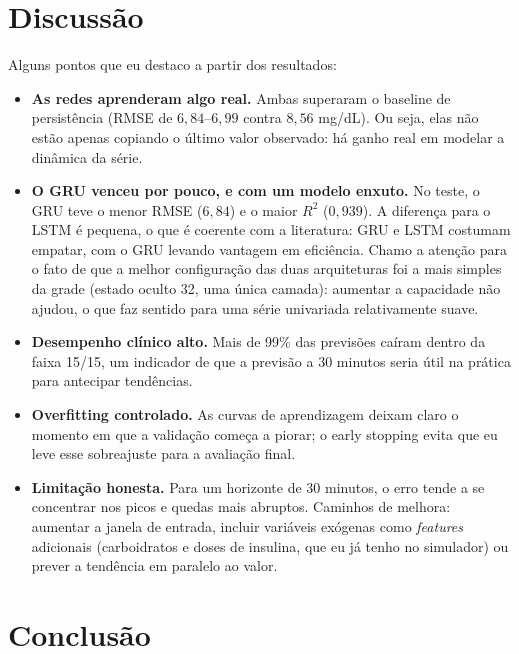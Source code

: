 \documentclass[11pt,a4paper]{article}
\begin{document}
\section{Discussão}

Alguns pontos que eu destaco a partir dos resultados:

\begin{itemize}
  \item \textbf{As redes aprenderam algo real.} Ambas superaram o baseline de
        persistência (RMSE de $6{,}84$--$6{,}99$ contra $8{,}56$ mg/dL). Ou
        seja, elas não estão apenas copiando o último valor observado: há ganho
        real em modelar a dinâmica da série.

  \item \textbf{O GRU venceu por pouco, e com um modelo enxuto.} No teste, o
        GRU teve o menor RMSE ($6{,}84$) e o maior $R^2$ ($0{,}939$). A
        diferença para o LSTM é pequena, o que é coerente com a literatura:
        GRU e LSTM costumam empatar, com o GRU levando vantagem em eficiência.
        Chamo a atenção para o fato de que a melhor configuração das duas
        arquiteturas foi a mais simples da grade (estado oculto 32, uma única
        camada): aumentar a capacidade não ajudou, o que faz sentido para uma
        série univariada relativamente suave.

  \item \textbf{Desempenho clínico alto.} Mais de 99\% das previsões caíram
        dentro da faixa 15/15, um indicador de que a previsão a 30 minutos
        seria útil na prática para antecipar tendências.

  \item \textbf{Overfitting controlado.} As curvas de aprendizagem deixam claro
        o momento em que a validação começa a piorar; o early stopping evita
        que eu leve esse sobreajuste para a avaliação final.

  \item \textbf{Limitação honesta.} Para um horizonte de 30 minutos, o erro
        tende a se concentrar nos picos e quedas mais abruptos. Caminhos de
        melhora: aumentar a janela de entrada, incluir variáveis exógenas como
        \emph{features} adicionais (carboidratos e doses de insulina, que eu já
        tenho no simulador) ou prever a tendência em paralelo ao valor.
\end{itemize}

\section{Conclusão}
\end{document}
